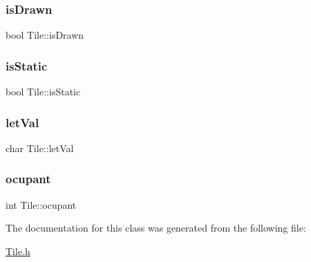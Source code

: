 \subsubsection{\texorpdfstring{is\+Drawn}{isDrawn}}
{\footnotesize\ttfamily bool Tile\+::is\+Drawn\hspace{0.3cm}{\ttfamily [private]}}

\mbox{\label{class_tile_ab6e4b6050959c3be7f3db33d5013c645}} 
\subsubsection{\texorpdfstring{is\+Static}{isStatic}}
{\footnotesize\ttfamily bool Tile\+::is\+Static\hspace{0.3cm}{\ttfamily [private]}}

\mbox{\label{class_tile_a57723b26da8821d5931d74e4d4a02379}} 
\subsubsection{\texorpdfstring{let\+Val}{letVal}}
{\footnotesize\ttfamily char Tile\+::let\+Val\hspace{0.3cm}{\ttfamily [private]}}

\mbox{\label{class_tile_a9370b4e54fcb4185e47571133ad51cc0}} 
\subsubsection{\texorpdfstring{ocupant}{ocupant}}
{\footnotesize\ttfamily int Tile\+::ocupant\hspace{0.3cm}{\ttfamily [private]}}



The documentation for this class was generated from the following file\+:\begin{DoxyCompactItemize}
\item 
\hyperlink{_tile_8h}{Tile.\+h}\end{DoxyCompactItemize}
